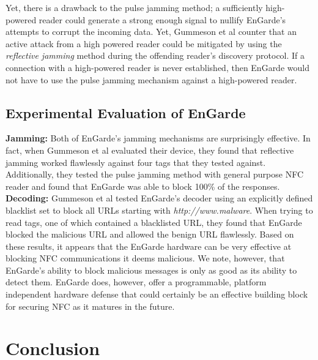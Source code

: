 \documentclass{sig-alternate}
\begin{document}
Yet, there is a drawback to the pulse jamming method; a sufficiently high-powered reader could generate a strong enough signal to nullify EnGarde's attempts to corrupt the incoming data. Yet, Gummeson et al counter that an active attack from a high powered reader could be mitigated by using the \textit{reflective jamming} method during the offending reader's discovery protocol. If a connection with a high-powered reader is never established, then EnGarde would not have to use the pulse jamming mechanism against a high-powered reader.

\subsection{Experimental Evaluation of EnGarde}
\noindent\textbf{Jamming:} Both of EnGarde's jamming mechanisms are surprisingly effective. In fact, when Gummeson et al evaluated their device, they found that reflective jamming worked flawlessly against four tags that they tested against. Additionally, they tested the pulse jamming method with general purpose NFC reader and found that EnGarde was able to block 100\% of the responses.
\vspace{2mm}\newline
\noindent\textbf{Decoding:}
Gummeson et al tested EnGarde's decoder using an explicitly defined blacklist set to block all URLs starting with \textit{http://www.malware}. When trying to read tags, one of which contained a blacklisted URL, they found that EnGarde blocked the malicious URL and allowed the benign URL flawlessly.
\vspace{2mm}\newline
Based on these results, it appears that the EnGarde hardware can be very effective at blocking NFC communications it deems malicious. We note, however, that EnGarde's ability to block malicious messages is only as good as its ability to detect them. EnGarde does, however, offer a  programmable, platform independent hardware defense that could certainly be an effective building block for securing NFC as it matures in the future.
\section{Conclusion}
\label{sec:conclusions}
\end{document}
